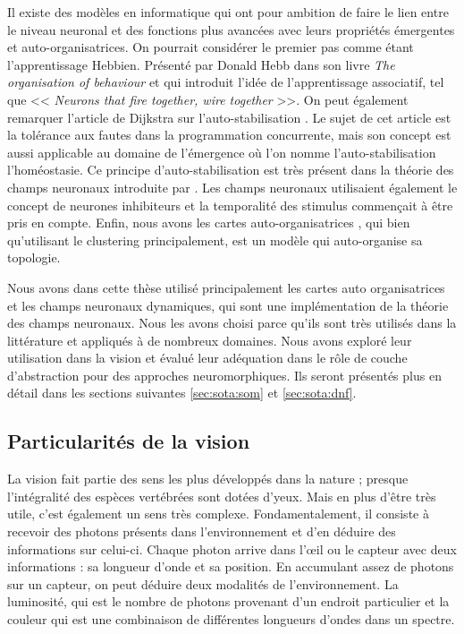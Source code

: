	Il existe des modèles en informatique qui ont pour ambition de faire le lien entre le niveau neuronal et des fonctions plus avancées avec leurs propriétés émergentes et auto-organisatrices. On pourrait considérer le premier pas comme étant l'apprentissage Hebbien. Présenté par Donald Hebb dans son livre \textit{The organisation of behaviour} \cite{hebb1949organisation} et qui introduit l'idée de l'apprentissage associatif, tel que << \textit{Neurons that fire together, wire together} >>. On peut également remarquer l'article de Dijkstra sur l'auto-stabilisation \cite{dijkstra1982self}. Le sujet de cet article est la tolérance aux fautes dans la programmation concurrente, mais son concept est aussi applicable au domaine de l'émergence où l'on nomme l'auto-stabilisation l'homéostasie. Ce principe d'auto-stabilisation est très présent dans la théorie des champs neuronaux introduite par \cite{amari1977dynamics}. Les champs neuronaux utilisaient également le concept de neurones inhibiteurs et la temporalité des stimulus commençait à être pris en compte. Enfin, nous avons les cartes auto-organisatrices \cite{kohonen-som82}, qui bien qu'utilisant le clustering principalement, est un modèle qui auto-organise sa topologie.

	Nous avons dans cette thèse utilisé principalement les cartes auto organisatrices et les champs neuronaux dynamiques, qui sont une implémentation de la théorie des champs neuronaux. Nous les avons choisi parce qu'ils sont très utilisés dans la littérature et appliqués à de nombreux domaines. Nous avons exploré leur utilisation dans la vision et évalué leur adéquation dans le rôle de couche d'abstraction pour des approches neuromorphiques. Ils seront présentés plus en détail dans les sections suivantes \ref{sec:sota:som} et \ref{sec:sota:dnf}.

\subsection{Particularités de la vision}\label{sec:sota:vision}

	La vision fait partie des sens les plus développés dans la nature ; presque l'intégralité des espèces vertébrées sont dotées d'yeux. Mais en plus d'être très utile, c'est également un sens très complexe. Fondamentalement, il consiste à recevoir des photons présents dans l'environnement et d'en déduire des informations sur celui-ci. Chaque photon arrive dans l'œil ou le capteur avec deux informations : sa longueur d'onde et sa position. En accumulant assez de photons sur un capteur, on peut déduire deux modalités de l'environnement. La luminosité, qui est le nombre de photons provenant d'un endroit particulier et la couleur qui est une combinaison de différentes longueurs d'ondes dans un spectre.

